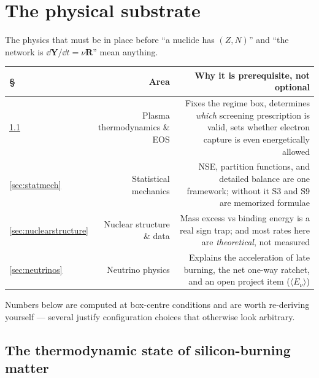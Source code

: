 \section{The physical substrate}
\label{part:substrate}

The physics that must be in place before ``a nuclide has $(Z,N)$'' and ``the
network is $\dd\mathbf{Y}/\dd t = \nu\mathbf{R}$'' mean anything.

\begin{center}
\small
\begin{tabularx}{\textwidth}{@{}l R{0.680} R{1.320}@{}}
\toprule
\textbf{\S} & \textbf{Area} &
\textbf{Why it is prerequisite, not optional} \\
\midrule
\ref{sec:thermostate} & Plasma thermodynamics \& EOS &
  Fixes the regime box, determines \emph{which} screening prescription is
  valid, sets whether electron capture is even energetically allowed \\
\ref{sec:statmech} & Statistical mechanics &
  NSE, partition functions, and detailed balance are one framework; without it
  S3 and S9 are memorized formulae \\
\ref{sec:nuclearstructure} & Nuclear structure \& data &
  Mass excess vs binding energy is a real sign trap; and most rates here are
  \emph{theoretical}, not measured \\
\ref{sec:neutrinos} & Neutrino physics &
  Explains the acceleration of late burning, the net one-way \Ye{} ratchet, and
  an open project item ($\langle E_\nu\rangle$) \\
\bottomrule
\end{tabularx}
\end{center}

Numbers below are computed at box-centre conditions and are worth re-deriving
yourself --- several justify configuration choices that otherwise look
arbitrary.

\subsection{The thermodynamic state of silicon-burning matter}
\label{sec:thermostate}

